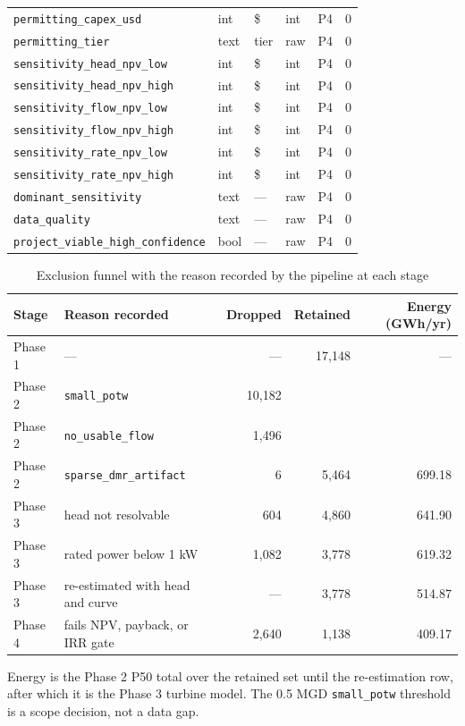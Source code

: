 \documentclass[12pt,letterpaper]{report}
\begin{document}
\begin{longtable}{@{}lllllr@{}}
\texttt{permitting\_capex\_usd} & int & \$ & int & P4 & 0 \\
\texttt{permitting\_tier} & text & tier & raw & P4 & 0 \\
\texttt{sensitivity\_head\_npv\_low} & int & \$ & int & P4 & 0 \\
\texttt{sensitivity\_head\_npv\_high} & int & \$ & int & P4 & 0 \\
\texttt{sensitivity\_flow\_npv\_low} & int & \$ & int & P4 & 0 \\
\texttt{sensitivity\_flow\_npv\_high} & int & \$ & int & P4 & 0 \\
\texttt{sensitivity\_rate\_npv\_low} & int & \$ & int & P4 & 0 \\
\texttt{sensitivity\_rate\_npv\_high} & int & \$ & int & P4 & 0 \\
\texttt{dominant\_sensitivity} & text & --- & raw & P4 & 0 \\
\texttt{data\_quality} & text & --- & raw & P4 & 0 \\
\texttt{project\_viable\_high\_confidence} & bool & --- & raw & P4 & 0 \\
\end{longtable}

\begin{table}[htbp]
\centering
\caption{Exclusion funnel with the reason recorded by the pipeline at each stage}
\label{tab:funnel_full}
\footnotesize
\begin{tabular}{@{}llrrr@{}}
\toprule
Stage & Reason recorded & Dropped & Retained & Energy (GWh/yr) \\
\midrule
Phase 1 & ---                              & ---       & 17{,}148 & --- \\
Phase 2 & \texttt{small\_potw}             & 10{,}182  &          &     \\
Phase 2 & \texttt{no\_usable\_flow}        & 1{,}496   &          &     \\
Phase 2 & \texttt{sparse\_dmr\_artifact}   & 6         & 5{,}464  & 699.18 \\
Phase 3 & head not resolvable              & 604       & 4{,}860  & 641.90 \\
Phase 3 & rated power below 1 kW           & 1{,}082   & 3{,}778  & 619.32 \\
Phase 3 & re-estimated with head and curve & ---       & 3{,}778  & 514.87 \\
Phase 4 & fails NPV, payback, or IRR gate  & 2{,}640   & 1{,}138  & 409.17 \\
\bottomrule
\end{tabular}

\vspace{0.4em}
{\footnotesize Energy is the Phase 2 P50 total over the retained set until the
re-estimation row, after which it is the Phase 3 turbine model. The 0.5 MGD
\texttt{small\_potw} threshold is a scope decision, not a data gap.}
\end{table}
\end{document}
